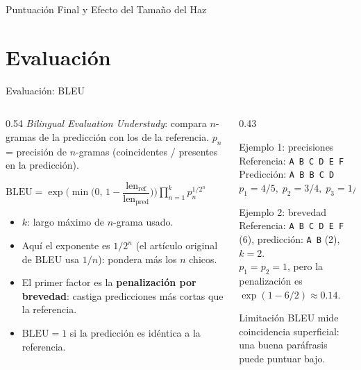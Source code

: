 \documentclass[aspectratio=169, 10pt]{beamer}
\newcommand{\formula}[1]{%
	\begin{tcolorbox}[colback=UCMBlue!8, colframe=UCMBlue, arc=4pt,
		boxsep=2pt, left=6pt, right=6pt, top=3pt, bottom=3pt]
		#1
	\end{tcolorbox}
}
\begin{document}
\begin{frame}[shrink]{Puntuaci\'on Final y Efecto del Tama\~no del Haz}
\end{frame}

\section{Evaluaci\'on}

\begin{frame}[shrink]{Evaluaci\'on: BLEU}

	\begin{columns}[T]
		\begin{column}{0.54\textwidth}
			\small
			\textit{Bilingual Evaluation Understudy}: compara $n$-gramas de la predicci\'on con los de la referencia. $p_n$ = precisi\'on de $n$-gramas (coincidentes / presentes en la predicci\'on).
			\formula{\centering \small $\mathrm{BLEU} = \exp\Big(\min\big(0,\,1-\dfrac{\mathrm{len}_{\mathrm{ref}}}{\mathrm{len}_{\mathrm{pred}}}\big)\Big)\displaystyle\prod_{n=1}^{k} p_n^{1/2^n}$}
			\begin{itemize}
				\item $k$: largo m\'aximo de $n$-grama usado.
				\item Aqu\'i el exponente es $1/2^n$ (el art\'iculo original de BLEU usa $1/n$): pondera m\'as los $n$ chicos.
				\item El primer factor es la \textbf{penalizaci\'on por brevedad}: castiga predicciones m\'as cortas que la referencia.
				\item $\mathrm{BLEU}=1$ si la predicci\'on es id\'entica a la referencia.
			\end{itemize}
		\end{column}

		\begin{column}{0.43\textwidth}
			\begin{block}{Ejemplo 1: precisiones}
				\scriptsize
				Referencia: \texttt{A B C D E F}\\
				Predicci\'on: \texttt{A B B C D}\\[2pt]
				$p_1 = 4/5,\; p_2 = 3/4,\; p_3 = 1/3,\; p_4 = 0$
			\end{block}
			\begin{block}{Ejemplo 2: brevedad}
				\scriptsize
				Referencia: \texttt{A B C D E F} (6), predicci\'on: \texttt{A B} (2), $k=2$.\\
				$p_1 = p_2 = 1$, pero la penalizaci\'on es $\exp(1-6/2)\approx 0.14$.
			\end{block}
			\begin{alertblock}{Limitaci\'on}
				\small
				BLEU mide coincidencia superficial: una buena paráfrasis puede puntuar bajo.
			\end{alertblock}
		\end{column}
	\end{columns}

\end{frame}
\end{document}
